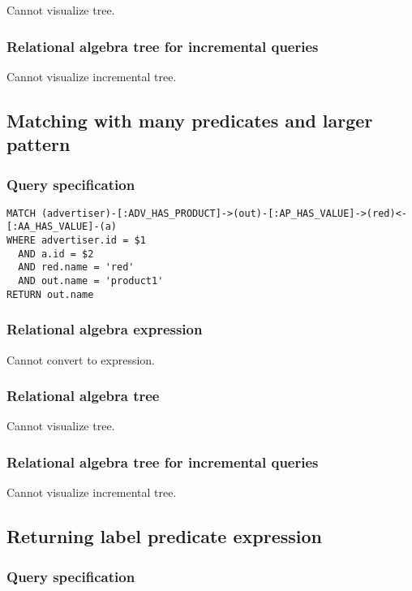 Cannot visualize tree.

\subsubsection*{Relational algebra tree for incremental queries}

Cannot visualize incremental tree.

\subsection{Matching with many predicates and larger pattern}

\subsubsection*{Query specification}

\begin{lstlisting}
MATCH (advertiser)-[:ADV_HAS_PRODUCT]->(out)-[:AP_HAS_VALUE]->(red)<-[:AA_HAS_VALUE]-(a)
WHERE advertiser.id = $1
  AND a.id = $2
  AND red.name = 'red'
  AND out.name = 'product1'
RETURN out.name
\end{lstlisting}

\subsubsection*{Relational algebra expression}

Cannot convert to expression.

\subsubsection*{Relational algebra tree}

Cannot visualize tree.

\subsubsection*{Relational algebra tree for incremental queries}

Cannot visualize incremental tree.

\subsection{Returning label predicate expression}

\subsubsection*{Query specification}

